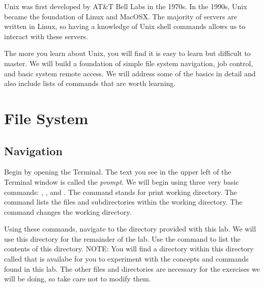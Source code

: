 \label{lab:Shell}


Unix was first developed by AT\&T Bell Labs in the 1970s. In the 1990s, Unix became the foundation of Linux and MacOSX. The majority of servers are written in Linux, so having a knowledge of Unix shell commands allows us to interact with these servers. 

The more you learn about Unix, you will find it is easy to learn but difficult to master. We will build a foundation of simple file system navigation, job control, and basic system remote access. We will address some of the basics in detail and also include lists of commands that are worth learning.

\section*{File System}
\subsection*{Navigation}

Begin by opening the Terminal. The text you see in the upper left of the Terminal window is called the \emph{prompt}. We will begin using three very basic commands: , , and . The  command stands for print working directory. The  command lists the files and subdirectories within the working directory. The  command changes the working directory.


\begin{problem}
Using these commands, navigate to the  directory provided with this lab. We will use this directory for the remainder of the lab. Use the  command to list the contents of this directory. NOTE: You will find a directory within this directory called  that is availabe for you to experiment with the concepts and commands found in this lab. The other files and directories are necessary for the exercises we will be doing, so take care not to modify them.
\end{problem}

